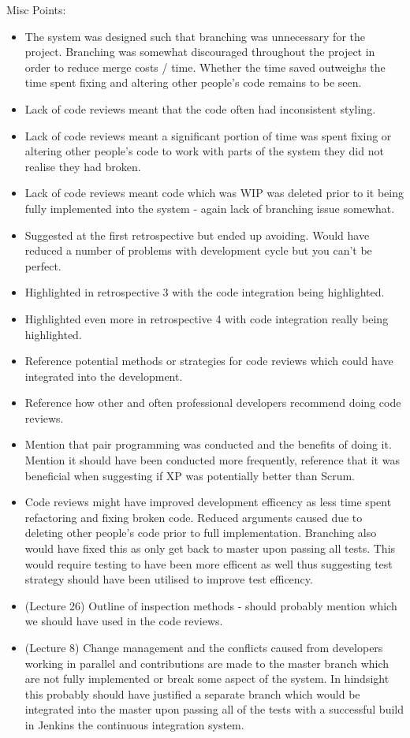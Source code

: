 \documentclass{l3proj}
\begin{document}
Misc Points:
\begin{itemize}
\item The system was designed such that branching was unnecessary for the project. Branching was somewhat discouraged throughout the project in order to reduce merge costs / time. Whether the time saved outweighs the time spent fixing and altering other people’s code remains to be seen.
\item Lack of code reviews meant that the code often had inconsistent styling.
\item Lack of code reviews meant a significant portion of time was spent fixing or altering other people's code to work with parts of the system they did not realise they had broken.
\item Lack of code reviews meant code which was WIP was deleted prior to it being fully implemented into the system - again lack of branching issue somewhat.
\item Suggested at the first retrospective but ended up avoiding. Would have reduced a number of problems with development cycle but you can't be perfect.
\item Highlighted in retrospective 3 with the code integration being highlighted.
\item Highlighted even more in retrospective 4 with code integration really being highlighted.
\item Reference potential methods or strategies for code reviews which could have integrated into the development.
\item Reference how other and often professional developers recommend doing code reviews.
\item Mention that pair programming was conducted and the benefits of doing it. Mention it should have been conducted more frequently, reference that it was beneficial when suggesting if XP was potentially better than Scrum.
\item Code reviews might have improved development efficency as less time spent refactoring and fixing broken code. Reduced arguments caused due to deleting other people's code prior to full implementation. Branching also would have fixed this as only get back to master upon passing all tests. This would require testing to have been more efficent as well thus suggesting test strategy should have been utilised to improve test efficency.
\item (Lecture 26) Outline of inspection methods - should probably mention which we should have used in the code reviews.
\item (Lecture 8) Change management and the conflicts caused from developers working in parallel and contributions are made to the master branch which are not fully implemented or break some aspect of the system. In hindsight this probably should have justified a separate branch which would be integrated into the master upon passing all of the tests with a successful build in Jenkins the continuous integration system.
\end{itemize}
\end{document}
